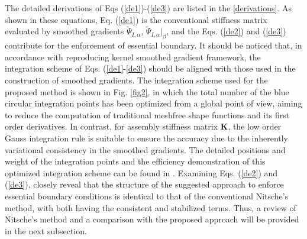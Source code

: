 The detailed derivations of Eqs (\ref{de1})-(\ref{de3}) are listed in the \ref{derivations}. As shown in these equations, Eq. (\ref{de1}) is the conventional stiffness matrix evaluated by smoothed gradients $\tilde \Psi_{I,\alpha}$, $\tilde \Psi_{I,\alpha}\vert_\beta$, and the Eqs. (\ref{de2}) and (\ref{de3}) contribute for the enforcement of essential boundary. It should be noticed that, in accordance with reproducing kernel smoothed gradient framework, the integration scheme of Eqs. (\ref{de1}-\ref{de3}) should be aligned with those used in the construction of smoothed gradients. The integration scheme used for the proposed method is shown in Fig. \ref{fig2}, in which the total number of the blue circular integration points has been optimized from a global point of view, aiming to reduce the computation of traditional meshfree shape functions and its first order derivatives. In contrast, for assembly stiffness matrix $\boldsymbol K$, the low order Gauss integration rule is suitable to ensure the accuracy due to the inherently variational consistency in the smoothed gradients. The detailed positions and weight of the integration points and the efficiency demonstration of this optimized integration scheme can be found in \cite{wang2019a, du2022}.  Examining Eqs. (\ref{de2}) and (\ref{de3}), closely reveal that the structure of the suggested approach to enforce essential boundary conditions is identical to that of the conventional Nitsche's method, with both having the consistent and stabilized terms. Thus, a review of Nitsche's method and a comparison with the proposed approach will be provided in the next subsection. 
